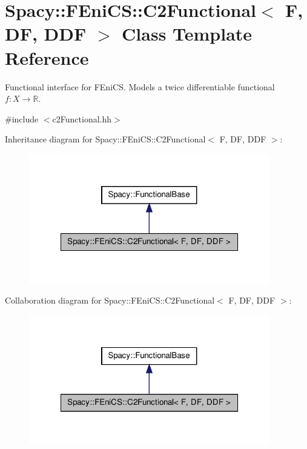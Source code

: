 \hypertarget{classSpacy_1_1FEniCS_1_1C2Functional}{\section{\-Spacy\-:\-:\-F\-Eni\-C\-S\-:\-:\-C2\-Functional$<$ \-F, \-D\-F, \-D\-D\-F $>$ \-Class \-Template \-Reference}
\label{classSpacy_1_1FEniCS_1_1C2Functional}
}


\-Functional interface for \-F\-Eni\-C\-S. \-Models a twice differentiable functional $f:X\rightarrow \mathbb{R}$.  




{\ttfamily \#include $<$c2\-Functional.\-hh$>$}



\-Inheritance diagram for \-Spacy\-:\-:\-F\-Eni\-C\-S\-:\-:\-C2\-Functional$<$ \-F, \-D\-F, \-D\-D\-F $>$\-:
\nopagebreak
\begin{figure}[H]
\begin{center}
\leavevmode
\includegraphics[width=298pt]{classSpacy_1_1FEniCS_1_1C2Functional__inherit__graph}
\end{center}
\end{figure}


\-Collaboration diagram for \-Spacy\-:\-:\-F\-Eni\-C\-S\-:\-:\-C2\-Functional$<$ \-F, \-D\-F, \-D\-D\-F $>$\-:
\nopagebreak
\begin{figure}[H]
\begin{center}
\leavevmode
\includegraphics[width=298pt]{classSpacy_1_1FEniCS_1_1C2Functional__coll__graph}
\end{center}
\end{figure}
